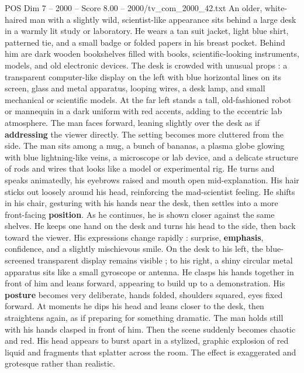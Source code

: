 \begin{textsample}{POS Dim 7 – 2000 – Score 8.00 – 2000/tv\_com\_2000\_42.txt}  \label{ex:f7_pos_072}
An older, white-haired man with a slightly wild, scientist-like appearance sits behind a large desk in a warmly lit study or laboratory.
He wears a tan suit jacket, light blue shirt, patterned tie, and a small badge or folded papers in his breast pocket.
Behind him are dark wooden bookshelves filled with books, scientific-looking instruments, models, and old electronic devices.
The desk is crowded with unusual props : a transparent computer-like display on the left with blue horizontal lines on its screen, glass and metal apparatus, looping wires, a desk lamp, and small mechanical or scientific models.
At the far left stands a tall, old-fashioned robot or mannequin in a dark uniform with red accents, adding to the eccentric lab atmosphere.
The man faces forward, leaning slightly over the desk as if \textbf{addressing} the viewer directly.
The setting becomes more cluttered from the side.
The man sits among a mug, a bunch of bananas, a plasma globe glowing with blue lightning-like veins, a microscope or lab device, and a delicate structure of rods and wires that looks like a model or experimental rig.
He turns and speaks animatedly, his eyebrows raised and mouth open mid-explanation.
His hair sticks out loosely around his head, reinforcing the mad-scientist feeling.
He shifts in his chair, gesturing with his hands near the desk, then settles into a more front-facing \textbf{position}.
As he continues, he is shown closer against the same shelves.
He keeps one hand on the desk and turns his head to the side, then back toward the viewer.
His expressions change rapidly : surprise, \textbf{emphasis}, confidence, and a slightly mischievous smile.
On the desk to his left, the blue-screened transparent display remains visible ; to his right, a shiny circular metal apparatus sits like a small gyroscope or antenna.
He clasps his hands together in front of him and leans forward, appearing to build up to a demonstration.
His \textbf{posture} becomes very deliberate, hands folded, shoulders squared, eyes fixed forward.
At moments he dips his head and leans closer to the desk, then straightens again, as if preparing for something dramatic.
The man holds still with his hands clasped in front of him.
Then the scene suddenly becomes chaotic and red.
His head appears to burst apart in a stylized, graphic explosion of red liquid and fragments that splatter across the room.
The effect is exaggerated and grotesque rather than realistic.

\end{textsample}
